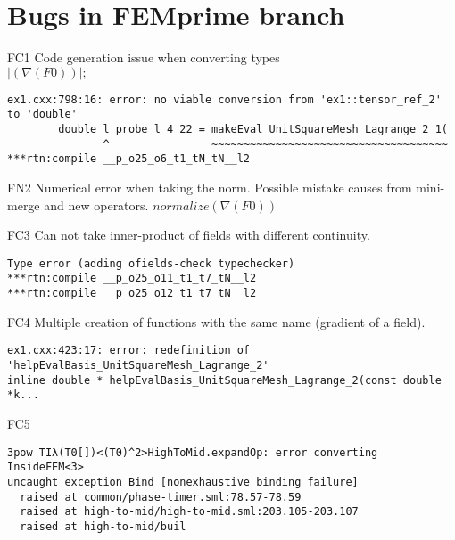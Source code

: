 \section{Bugs in FEMprime branch}

\begin{description}
\item{FC1} Code generation issue when converting types\\
$|(\nabla(F0))|;$

\begin{lstlisting}[mathescape=true]
ex1.cxx:798:16: error: no viable conversion from 'ex1::tensor_ref_2' to 'double'
        double l_probe_l_4_22 = makeEval_UnitSquareMesh_Lagrange_2_1(
               ^                ~~~~~~~~~~~~~~~~~~~~~~~~~~~~~~~~~~~~~
***rtn:compile __p_o25_o6_t1_tN_tN__l2
\end{lstlisting}
\item{FN2}
Numerical error  when taking the norm. Possible mistake causes from mini-merge and new operators.
$normalize(\nabla(F0))$

\item{FC3} Can not take inner-product of fields with different continuity.
\begin{lstlisting}[mathescape=true]
Type error (adding ofields-check typechecker)
***rtn:compile __p_o25_o11_t1_t7_tN__l2
***rtn:compile __p_o25_o12_t1_t7_tN__l2
\end{lstlisting}
\item{FC4} Multiple creation of functions with the same name (gradient of a field).
\begin{lstlisting}[mathescape=true]
ex1.cxx:423:17: error: redefinition of 'helpEvalBasis_UnitSquareMesh_Lagrange_2'
inline double * helpEvalBasis_UnitSquareMesh_Lagrange_2(const double *k...
\end{lstlisting}

\item{FC5}
\begin{lstlisting}[mathescape=true]
3pow TIλ(T0[])<(T0)^2>HighToMid.expandOp: error converting InsideFEM<3>
uncaught exception Bind [nonexhaustive binding failure]
  raised at common/phase-timer.sml:78.57-78.59
  raised at high-to-mid/high-to-mid.sml:203.105-203.107
  raised at high-to-mid/buil
  \end{lstlisting}
\end{description}
